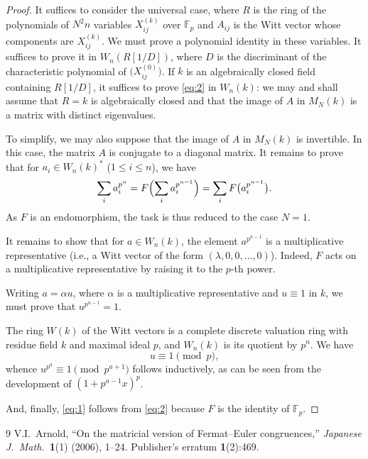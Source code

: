 \documentclass[11pt,a4paper]{article}
\theoremstyle{plain}
\theoremstyle{definition}
\begin{document}
\begin{proof}
It suffices to consider the universal case, where $R$ is the ring of the polynomials of $N^2 n$ variables $X_{ij}^{(k)}$ over $\mathbb{F}_p$ and $A_{ij}$ is the Witt vector whose components are $X_{ij}^{(k)}$. We must prove a polynomial identity in these variables. It suffices to prove it in $W_n(R[1/D])$, where $D$ is the discriminant of the characteristic polynomial of $\bigl(X_{ij}^{(0)}\bigr)$. If $k$ is an algebraically closed field containing $R[1/D]$, it suffices to prove \eqref{eq:2} in $W_n(k)$: we may and shall assume that $R = k$ is algebraically closed and that the image of $A$ in $M_N(k)$ is a matrix with distinct eigenvalues.

To simplify, we may also suppose that the image of $A$ in $M_N(k)$ is invertible. In this case, the matrix $A$ is conjugate to a diagonal matrix. It remains to prove that for $a_i \in W_n(k)^*$ ($1 \leq i \leq n$), we have
\[
\sum_i a_i^{p^n} = F\Bigl(\sum_i a_i^{p^{n-1}}\Bigr) = \sum_i F\bigl(a_i^{p^{n-1}}\bigr).
\]
As $F$ is an endomorphism, the task is thus reduced to the case $N = 1$.

It remains to show that for $a \in W_n(k)$, the element $a^{p^{n-1}}$ is a multiplicative representative (i.e., a Witt vector of the form $(\lambda, 0, 0, \dots, 0)$). Indeed, $F$ acts on a multiplicative representative by raising it to the $p$-th power.

Writing $a = \alpha u$, where $\alpha$ is a multiplicative representative and $u \equiv 1$ in $k$, we must prove that $u^{p^{n-1}} = 1$.

The ring $W(k)$ of the Witt vectors is a complete discrete valuation ring with residue field $k$ and maximal ideal $p$, and $W_n(k)$ is its quotient by $p^n$. We have
\[
u \equiv 1 \pmod{p},
\]
whence $u^{p^a} \equiv 1 \pmod{p^{a+1}}$ follows inductively, as can be seen from the development of $(1 + p^{a-1}x)^p$.

And, finally, \eqref{eq:1} follows from \eqref{eq:2} because $F$ is the identity of $\mathbb{F}_p$.
\end{proof}

\begin{thebibliography}{9}
V.I.\ Arnold, ``On the matricial version of Fermat--Euler congruences,'' \textit{Japanese J.\ Math.}\ \textbf{1}(1) (2006), 1--24. Publisher's erratum \textbf{1}(2):469.
\end{thebibliography}
\end{document}
